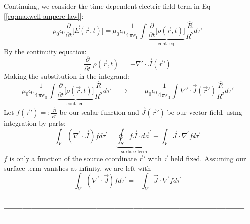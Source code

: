 \documentclass[a4paper,12pt]{article} %
\begin{document}
Continuing, we consider the time dependent electric field term in Eq [\ref{eq:maxwell-ampere-law}]:
$$  \mu_0\epsilon_0 \frac{\partial}{\partial t} \Big[\vec{E}(\vec{r}, t)\Big] = \mu_0\epsilon_0 \frac{1}{4\pi\epsilon_0}\int \underbrace{\frac{\partial}{\partial t}\Big[\rho(\vec{r}, t)\Big]}_{\text{cont. eq.}} \frac{\hat{R}}{{R^2}} d\tau' $$
By the continuity equation:
$$ \frac{\partial}{\partial t}\Big[\rho(\vec{r}, t)\Big] = -\nabla' \cdot \vec{J}(\overrightarrow{r}') $$
Making the substitution in the integrand:
$$ \mu_0\epsilon_0 \frac{1}{4\pi\epsilon_0}\int \underbrace{\frac{\partial}{\partial t}\Big[\rho(\vec{r}, t)\Big]}_{\text{cont. eq.}} \frac{\hat{R}}{{R^2}} d\tau' \quad\rightarrow\quad -\mu_0\epsilon_0 \frac{1}{4\pi\epsilon_0}\int \nabla' \cdot \vec{J}(\overrightarrow{r}') \frac{\hat{R}}{{R^2}} d\tau' $$
Let $ f(\overrightarrow{r}') =: \frac{\hat{R}}{{R^2}} $ be our scalar function and $ \vec{J}(\overrightarrow{r}') $ be our vector field, using integration by parts:
$$\int_V\left(\nabla^{\prime} \cdot \vec{J}\right) f d \tau^{\prime}=\underbrace{\oint_S f \vec{J} \cdot d \overrightarrow{a}^{\prime}}_{\text{surface term}}-\int_V \vec{J} \cdot \nabla^{\prime} f d \tau^{\prime}$$
$f$ is only a function of the source coordinate $\overrightarrow{r}'$ with $\vec{r}$ held fixed.
Assuming our surface term vanishes at infinity, we are left with
$$ \int_V\left(\nabla^{\prime} \cdot \vec{J}\right) f d \tau^{\prime} = -\int_V \vec{J} \cdot \nabla^{\prime} f d \tau^{\prime} $$

\subsubsection*{-----------------------------------------------------------------------------------------------------}
\end{document}
